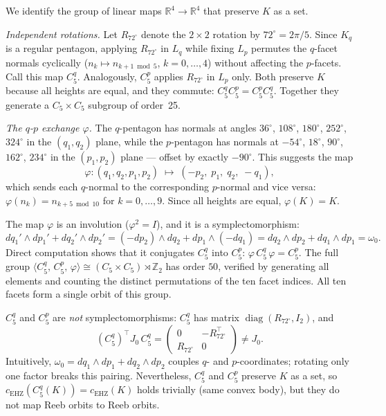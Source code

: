 We identify the group of linear maps $\mathbb{R}^4 \to \mathbb{R}^4$
that preserve $K$ as a set.

\emph{Independent rotations.}
Let $R_{72^\circ}$ denote the $2{\times}2$ rotation by $72^\circ = 2\pi/5$.
Since $K_q$ is a regular pentagon, applying $R_{72^\circ}$ in $L_q$
while fixing $L_p$ permutes the $q$-facet normals cyclically
($n_k \mapsto n_{k+1\bmod 5}$, $k = 0, \ldots, 4$)
without affecting the $p$-facets.
Call this map $C_5^q$.
Analogously, $C_5^p$ applies $R_{72^\circ}$ in $L_p$ only.
Both preserve $K$ because all heights are equal, and they commute:
$C_5^q C_5^p = C_5^p C_5^q$.
Together they generate a $C_5 \times C_5$ subgroup of order~25.

\emph{The $q$\nobreakdash-$p$ exchange $\varphi$.}
The $q$-pentagon has normals at angles
$36^\circ$, $108^\circ$, $180^\circ$, $252^\circ$, $324^\circ$
in the $(q_1, q_2)$ plane, while the $p$-pentagon has normals at
$-54^\circ$, $18^\circ$, $90^\circ$, $162^\circ$, $234^\circ$
in the $(p_1, p_2)$ plane --- offset by exactly $-90^\circ$.
This suggests the map
\[
  \varphi \colon (q_1, q_2, p_1, p_2)
  \;\mapsto\; (-p_2,\; p_1,\; q_2,\; -q_1),
\]
which sends each $q$-normal to the corresponding $p$-normal and vice
versa: $\varphi(n_k) = n_{k+5\bmod 10}$ for $k = 0, \ldots, 9$.
Since all heights are equal, $\varphi(K) = K$.

The map $\varphi$ is an involution ($\varphi^2 = I$), and it is a
symplectomorphism:
\[
  dq_1' \wedge dp_1' + dq_2' \wedge dp_2'
  = (-dp_2) \wedge dq_2 + dp_1 \wedge (-dq_1)
  = dq_2 \wedge dp_2 + dq_1 \wedge dp_1
  = \omega_0.
\]
Direct computation shows that it conjugates $C_5^q$ into $C_5^p$:
$\varphi \, C_5^q \, \varphi = C_5^p$.
The full group
$\langle C_5^q,\, C_5^p,\, \varphi \rangle
\cong (C_5 \times C_5) \rtimes \mathbb{Z}_2$
has order $50$, verified by generating all elements and
counting the distinct permutations of the ten facet indices.
All ten facets form a single orbit of this group.

\begin{remark}\label{rem:non-symplectic-rotations}
$C_5^q$ and $C_5^p$ are \emph{not} symplectomorphisms:
$C_5^q$ has matrix $\operatorname{diag}(R_{72^\circ}, I_2)$, and
\[
  (C_5^q)^\top J_0\, C_5^q
  = \begin{pmatrix} 0 & -R_{72^\circ}^\top \\ R_{72^\circ} & 0 \end{pmatrix}
  \neq J_0.
\]
Intuitively, $\omega_0 = dq_1 \wedge dp_1 + dq_2 \wedge dp_2$ couples
$q$- and $p$-coordinates; rotating only one factor breaks this pairing.
Nevertheless, $C_5^q$ and $C_5^p$ preserve $K$ as a set, so
$c_{\mathrm{EHZ}}(C_5^q(K)) = c_{\mathrm{EHZ}}(K)$
holds trivially (same convex body), but they do not map Reeb orbits
to Reeb orbits.
\end{remark}


